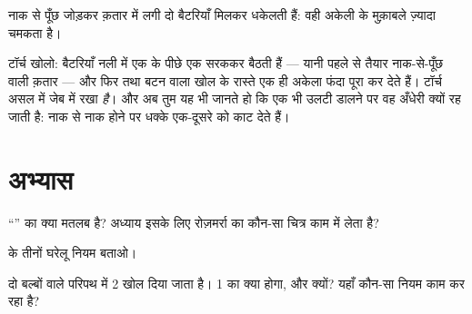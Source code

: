 \begin{omfigure}

{\small नाक से पूँछ जोड़कर क़तार में लगी दो बैटरियाँ मिलकर धकेलती
हैं: वही  अकेली  के मुक़ाबले ज़्यादा चमकता है।}
\end{omfigure}

\begin{example}[टॉर्च के भीतर]\label{ex:g4:series-circuits:flashlight}
टॉर्च खोलो: बैटरियाँ नली में एक के पीछे एक सरककर बैठती हैं ---
यानी पहले से तैयार नाक-से-पूँछ वाली क़तार --- और फिर  तथा बटन वाला
 खोल के रास्ते एक ही अकेला फंदा पूरा कर देते हैं। टॉर्च असल में
जेब में रखा  \emph{है}। और अब तुम यह भी जानते हो कि एक भी
 उलटी डालने पर वह अँधेरी क्यों रह जाती है: नाक से नाक होने पर
धक्के एक-दूसरे को काट देते हैं।
\end{example}

\section{अभ्यास}

\begin{exercise}[$\star$]\label{exo:g4:series-circuits:1}
``'' का क्या मतलब है? अध्याय इसके लिए रोज़मर्रा का कौन-सा
चित्र काम में लेता है?
\end{exercise}

\begin{exercise}[$\star$]\label{exo:g4:series-circuits:2}
 के तीनों घरेलू नियम बताओ।
\end{exercise}

\begin{exercise}[$\star$]\label{exo:g4:series-circuits:3}
दो बल्बों वाले परिपथ में  2 खोल दिया जाता है।  1 का क्या
होगा, और क्यों? यहाँ कौन-सा नियम काम कर रहा है?
\end{exercise}


